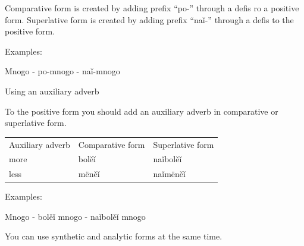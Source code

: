 Comparative form is created by adding prefix “po-” through a defis ro a positive form. Superlative form is created by adding prefix “naǐ-” through a defis to the positive form.

Examples:

Mnogo - po-mnogo - naǐ-mnogo

Using an auxiliary adverb

To the positive form you should add an auxiliary adverb in comparative or superlative form.

\begin{table}
	\begin{tabular}{lll}
		Auxiliary adverb
		& Comparative form
		& Superlative form \\
		more & bolěǐ & naǐbolěǐ \\
		less & mëněǐ & naǐmëněǐ \\
	\end{tabular}
\end{table}

Examples:

Mnogo - bolěǐ mnogo - naǐbolěǐ mnogo

You can use synthetic and analytic forms at the same time.
